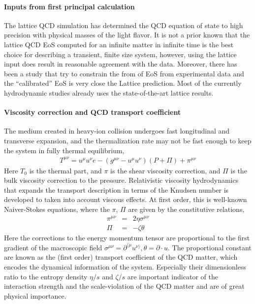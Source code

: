 \paragraph{Inputs from first principal calculation} The lattice QCD simulation has determined the QCD equation of state to high precision with physical masses of the light flavor.
It is not a prior known that the lattice QCD EoS computed for an infinite matter in infinite time is the best choice for describing a transient, finite size system, however, using the lattice input does result in reasonable agreement with the data.
Moreover, there has been a study that try to constrain the from of EoS from experimental data and the ``calibrated'' EoS is very close the Lattice prediction.
Most of the currently hydrodynamic studies already uses the state-of-the-art lattice results.
\paragraph{Viscosity correction and QCD transport coefficient}
The medium created in heavy-ion collision undergoes fast longitudinal and transverse expansion, and the thermalization rate may not be fast enough to keep the system in fully thermal equilibrium,
\begin{eqnarray}
T^{\mu\nu} = u^\mu u^\nu e - (g^{\mu\nu}- u^\mu u^\nu) (P+\Pi) + \pi^{\mu\nu}
\end{eqnarray}
Here $T_0$ is the thermal part, and $\pi$ is the shear viscosity correction, and $\Pi$ is the bulk viscosity correction to the pressure.
Relativistic viscosity hydrodynamics that expands the transport description in terms of the Knudsen number is developed to taken into account viscous effects.
At first order, this is well-known Naiver-Stokes equations, where the $\pi$, $\Pi$ are given by the constitutive relations,
\begin{eqnarray}
\pi^{\mu\nu} &=& 2\eta\sigma^{\mu\nu}\\
\Pi &=& -\zeta\theta
\end{eqnarray}
Here the corrections to the energy momentum tensor are proportional to the first gradient of the macroscopic field $\sigma^{\mu\nu} = \partial^{\langle \mu} u^{\nu\rangle}, \theta = \partial\cdot u$.
The proportional constant are known as the (first order) transport coefficient of the QCD matter, which encodes the dynamical information of the system. 
Especially their dimensionless ratio to the entropy density $\eta/s$ and $\zeta/s$ are important indicator of the interaction strength and the scale-violation of the QCD matter and are of great physical importance.
